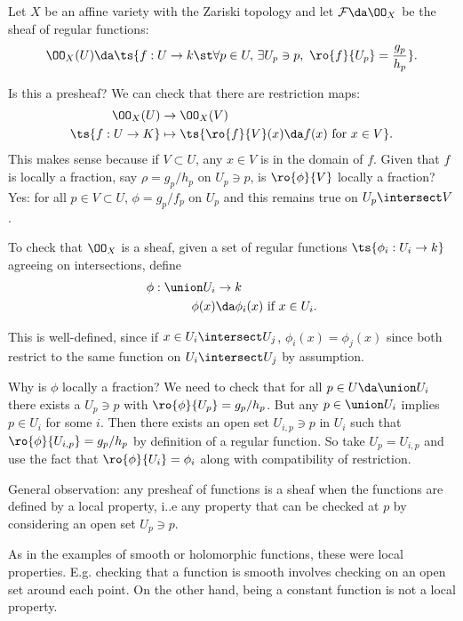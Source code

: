 \begin{example}

Let \(X\) be an affine variety with the Zariski topology and let
\(\mathcal{F} \da \OO_X\) be the sheaf of regular functions:
\begin{align*}  
\OO_X(U) \da \ts{f: U\to k \st \forall p\in U,\, \exists U_p \ni p,\,\, \ro{f}{U_p} ={g_p \over h_p} }
.\end{align*}

Is this a presheaf? We can check that there are restriction maps:
\begin{align*}  
\OO_X(U) &\to \OO_X(V) \\
\ts{f: U\to K} &\mapsto \ts{\ro{f}{V}(x) \da f(x) \text{ for } x \in V }
.\end{align*} This makes sense because if \(V\subset U\), any \(x\in V\)
is in the domain of \(f\). Given that \(f\) is locally a fraction, say
\(\rho = g_p / h_p\) on \(U_p \ni p\), is \(\ro{\phi}{V}\) locally a
fraction? Yes: for all \(p\in V\subset U\), \(\phi = g_p / f_p\) on
\(U_p\) and this remains true on \(U_p \intersect V\).

To check that \(\OO_X\) is a sheaf, given a set of regular functions
\(\ts{\phi_i: U_i \to k}\) agreeing on intersections, define
\begin{align*}  
\phi: \union U_i &\to k\\
\phi(x) &\da \phi_i(x) \text{ if }x\in U_i
.\end{align*}

This is well-defined, since if \(x\in U_i \intersect U_j\),
\(\phi_i(x) = \phi_j(x)\) since both restrict to the same function on
\(U_i \intersect U_j\) by assumption.

Why is \(\phi\) locally a fraction? We need to check that for all
\(p\in U \da \union U_i\) there exists a \(U_p \ni p\) with
\(\ro{\phi}{U_p} = g_p/h_p\). But any \(p\in \union U_i\) implies
\(p\in U_i\) for some \(i\). Then there exists an open set
\(U_{i, p} \ni p\) in \(U_i\) such that
\(\ro{\phi}{U_{i, p}} = g_p / h_p\) by definition of a regular function.
So take \(U_p = U_{i, p}\) and use the fact that
\(\ro{\phi}{U_i} = \phi_i\) along with compatibility of restriction.

\end{example}

\begin{remark}

General observation: any presheaf of functions is a sheaf when the
functions are defined by a local property, i..e any property that can be
checked at \(p\) by considering an open set \(U_p \ni p\).

As in the examples of smooth or holomorphic functions, these were local
properties. E.g. checking that a function is smooth involves checking on
an open set around each point. On the other hand, being a constant
function is not a local property.

\end{remark}

